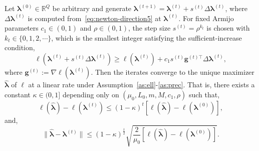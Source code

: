 \begin{theorem}
    Let $\bm{\lambda}^{(0)}\in \mathbb{R}^{Q}$ be arbitrary and generate $\bm{\lambda}^{(t+1)}=\bm{\lambda}^{(t)}+s^{(t)}\Delta \bm{\lambda}^{(t)}$, where $\Delta \bm{\lambda}^{(t)}$ is computed from~\eqref{eq:newton-direction5} at $\bm{\lambda}^{(t)}$. For fixed Armijo parameters $c_{1}\in(0,1)$ and $\rho\in (0,1)$, the step size $s^{(t)}=\rho^{k_{t}}$ is chosen with $k_{t}\in \{0,1,2,\cdots\}$, which is the smallest integer satisfying the sufficient-increase condition,
    \begin{equation}
        \ell(\bm{\lambda}^{(t)}+s^{(t)}\Delta \bm{\lambda}^{(t)})\geq \ell(\bm{\lambda}^{(t)})+c_{1}s^{(t)}\mathbf{g}^{(t)\top}\Delta \bm{\lambda}^{(t)},
        \label{eq:thm1-1}
    \end{equation}
    where $\mathbf{g}^{(t)}:=\nabla\ell(\bm{\lambda}^{(t)})$. Then the iterates converge to the unique maximizer $\hat{\bm{\lambda}}$ of $\ell$ at a linear rate under Assumption~\ref{as:ell}-\ref{as:prec}. That is, there exists a constant $\kappa\in (0,1]$ depending only on $(\mu_{0},L_{0},m,M,c_{1},\rho)$ such that,
    \begin{equation}
        \ell(\hat{\bm{\lambda}})-\ell(\bm{\lambda}^{(t)})\leq (1-\kappa)^{t}[\ell(\hat{\bm{\lambda}})-\ell(\bm{\lambda}^{(0)})],
        \label{eq:thm1-2}
    \end{equation}
    and,
    \begin{equation}
        \|\hat{\bm{\lambda}}-\bm{\lambda}^{(t)}\|\leq (1-\kappa)^{\frac{t}{2}}\sqrt{\frac{2}{\mu_{0}}[\ell(\hat{\bm{\lambda}})-\ell(\bm{\lambda}^{(0)})]}.
        \label{eq:thm1-3}
    \end{equation}
    \label{thm:convergence}
\end{theorem}

